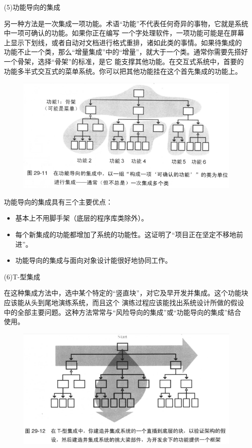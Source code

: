 \documentclass{article}
\begin{document}
\par
(5)功能导向的集成
\par
另一种方法是一次集成一项功能。术语“功能”不代表任何奇异的事物，它就是系统中一项可确认的功能。如果你正在编写
一个字处理软件，一项功能可能是在屏幕上显示下划线，或者自动对文档进行格式重排，诸如此类的事情。如果待集成的
功能不止一个类，那么“增量集成”中的“增量”，就大于一个类。通常你需要先搭好一个骨架，选择“骨架”的标准，是它
能支撑其他功能。在交互式系统中，首要的功能多半式交互式的菜单系统。你可以把其他功能挂在这个首先集成的功能上。
\begin{figure}[htb]
    \centering
    \includegraphics[width=15cm]{figure30.png}
\end{figure}
功能导向的集成具有三个主要优点：
\begin{itemize}
    \item 基本上不用脚手架（底层的程序库类除外）。
    \item 每个新集成的功能都增加了系统的功能性。这证明了“项目正在坚定不移地前进”。
    \item 功能导向的集成与面向对象设计能很好地协同工作。
\end{itemize}

\par
(6)T-型集成
\par
在这种集成方法中，选中某个特定的“竖直块”，对它及早开发并集成。这个功能块应该能从头到尾地演练系统，而且这个
演练过程应该能找出系统设计所做的假设中的全部主要问题。这种方法常常与“风险导向的集成”或“功能导向的集成”结合
使用。
\begin{figure}[htb]
    \centering
    \includegraphics[width=15cm]{figure31.png}
\end{figure}
\end{document}
